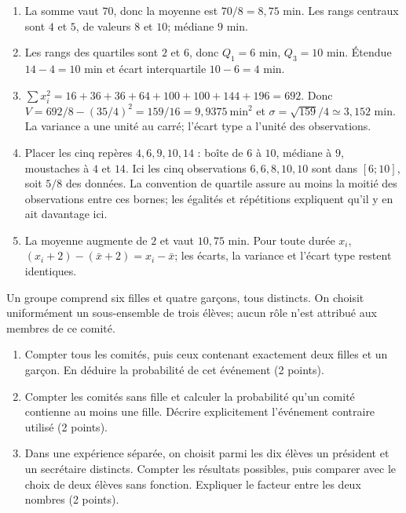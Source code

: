 \begin{corrige}\label{sol-t11s-ds4-e02}
\begin{enumerate}
\item La somme vaut $70$, donc la moyenne est $70/8=8{,}75$ min. Les rangs centraux sont $4$ et $5$, de valeurs $8$ et $10$; médiane $9$ min.
\item Les rangs des quartiles sont $2$ et $6$, donc $Q_1=6$ min, $Q_3=10$ min. Étendue $14-4=10$ min et écart interquartile $10-6=4$ min.
\item $\sum x_i^2=16+36+36+64+100+100+144+196=692$. Donc $V=692/8-(35/4)^2=159/16=9{,}9375\ \mathrm{min}^2$ et $\sigma=\sqrt{159}/4\simeq3{,}152$ min. La variance a une unité au carré; l’écart type a l’unité des observations.
\item Placer les cinq repères $4,6,9,10,14$ : boîte de $6$ à $10$, médiane à $9$, moustaches à $4$ et $14$. Ici les cinq observations $6,6,8,10,10$ sont dans $[6;10]$, soit $5/8$ des données. La convention de quartile assure au moins la moitié des observations entre ces bornes; les égalités et répétitions expliquent qu’il y en ait davantage ici.
\item La moyenne augmente de $2$ et vaut $10{,}75$ min. Pour toute durée $x_i$, $(x_i+2)-(\bar x+2)=x_i-\bar x$; les écarts, la variance et l’écart type restent identiques.
\end{enumerate}
\end{corrige}
\label{t11s-ds4-e03}\par
Un groupe comprend six filles et quatre garçons, tous distincts. On choisit uniformément un sous-ensemble de trois élèves; aucun rôle n’est attribué aux membres de ce comité.
\begin{enumerate}
\item Compter tous les comités, puis ceux contenant exactement deux filles et un garçon. En déduire la probabilité de cet événement (2 points).
\item Compter les comités sans fille et calculer la probabilité qu’un comité contienne au moins une fille. Décrire explicitement l’événement contraire utilisé (2 points).
\item Dans une expérience séparée, on choisit parmi les dix élèves un président et un secrétaire distincts. Compter les résultats possibles, puis comparer avec le choix de deux élèves sans fonction. Expliquer le facteur entre les deux nombres (2 points).
\end{enumerate}
